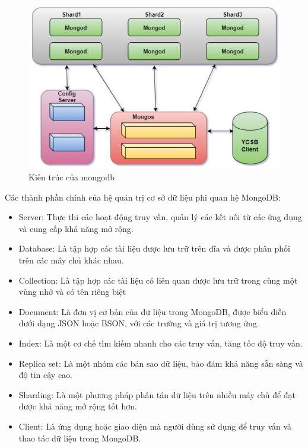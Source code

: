 \documentclass[../DoAn.tex]{subfiles}
\begin{document}
\begin{figure}[H]
    \centering
    \includegraphics[]{Hinhve/mongodb_architecture.png}
    \caption{Kiến trúc của mongodb}
    \label{fig:my_label2}
\end{figure}

Các thành phần chính của hệ quản trị cơ sở dữ liệu phi quan hệ MongoDB:
\begin{itemize}
    \item Server: Thực thi các hoạt động truy vấn, quản lý các kết nối từ các ứng dụng và cung cấp khả năng mở rộng.
    \item Database: Là tập hợp các tài liệu được lưu trữ trên đĩa và được phân phối trên các máy chủ khác nhau.
    \item Collection: Là tập hợp các tài liệu có liên quan được lưu trữ trong cùng một vùng nhớ và có tên riêng biệt
    \item Document: Là đơn vị cơ bản của dữ liệu trong MongoDB, được biểu diễn dưới dạng JSON hoặc BSON, với các trường và giá trị tương ứng.
    \item Index: Là một cơ chế tìm kiếm nhanh cho các truy vấn, tăng tốc độ truy vấn.
    \item Replica set: Là một nhóm các bản sao dữ liệu, bảo đảm khả năng sẵn sàng và độ tin cậy cao.
    \item Sharding: Là một phương pháp phân tán dữ liệu trên nhiều máy chủ để đạt được khả năng mở rộng tốt hơn.
    \item Client: Là ứng dụng hoặc giao diện mà người dùng sử dụng để truy vấn và thao tác dữ liệu trong MongoDB.
\end{itemize}
\end{document}
